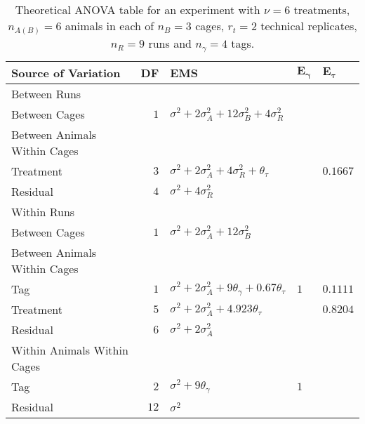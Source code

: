 \begin{table}[ht]
\centering
 \caption{Theoretical ANOVA table for an experiment with $\nu = 6$ treatments, $n_{A(B)} = 6$ animals in each of  $n_B = 3$ cages, $r_t = 2$ technical replicates, $n_R = 9$ runs and $n_\gamma = 4$ tags.}
 \begin{tabular}{lrlll} 
 \toprule 
 \multicolumn{1}{l}{\textbf{Source of Variation}} & \multicolumn{1}{l}{\textbf{DF}} & \multicolumn{1}{l}{\textbf{EMS}}& \multicolumn{1}{l}{$\bm{E_{\gamma}}$}&\multicolumn{1}{l}{$\bm{E_{\tau}}$}\\ 
 \midrule 
 Between Runs &  &  & & \\ 
 \quad Between Cages & $1$ & $\sigma^2+2\sigma_{A}^2+12\sigma_{B}^2+4\sigma_{R}^2$ & & \\ \hline
 \quad Between Animals Within Cages &  &  & & \\ 
 \quad \quad Treatment & $3$ & $\sigma^2+2\sigma_{A}^2+4\sigma_{R}^2+\theta_{\tau}$ & & $0.1667$\\ 
 \quad Residual & $4$ & $\sigma^2+4\sigma_{R}^2$ & & \\ \hline
 Within Runs &  &  & & \\ 
 \quad Between Cages & $1$ & $\sigma^2+2\sigma_{A}^2+12\sigma_{B}^2$ & & \\ \hline
 \quad Between Animals Within Cages &  &  & & \\ 
 \quad \quad Tag & $1$ & $\sigma^2+2\sigma_{A}^2+9\theta_{\gamma}+ 0.67\theta_{\tau}$ &$1$ & $ 0.1111$\\ 
 \quad \quad Treatment & $5$ & $\sigma^2+2\sigma_{A}^2+4.923\theta_{\tau}$ & & $ 0.8204$\\ 
 \quad \quad Residual & $6$ & $\sigma^2+2\sigma_{A}^2$ & & \\ \hline
 \quad Within Animals Within Cages &  &  & & \\ 
 \quad \quad Tag & $2$ & $\sigma^2+9\theta_{\gamma}$ &$1$ & \\ 
 \quad \quad Residual & $12$ & $\sigma^2$ & & \\ 
 \bottomrule 
 \end{tabular} 
 \label{tab:Phase2ANOVAEX1} 
\end{table} 

